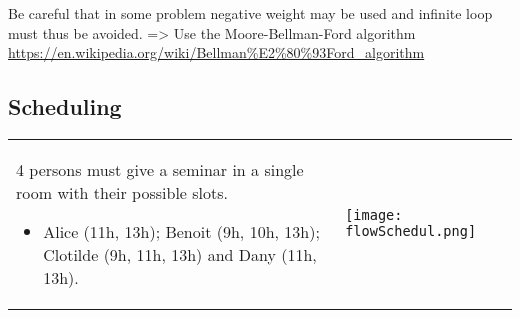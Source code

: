 \begin{figure}[!ht]
    \centering
\end{figure}

Be careful that in some problem negative weight may be used and infinite
loop must thus be avoided. => Use the Moore-Bellman-Ford algorithm
\url{https://en.wikipedia.org/wiki/Bellman%E2%80%93Ford_algorithm} 


\subsection{Scheduling}

\begin{tabular}{m{8cm}m{7cm}}
4 persons must give a seminar in a
single room with their possible slots.
\begin{itemize}
    \item  Alice (11h, 13h); Benoit (9h, 10h, 13h);
        Clotilde (9h, 11h, 13h) and Dany (11h, 13h).
\end{itemize}
&
\texttt{[image: flowSchedul.png]}
\end{tabular}



